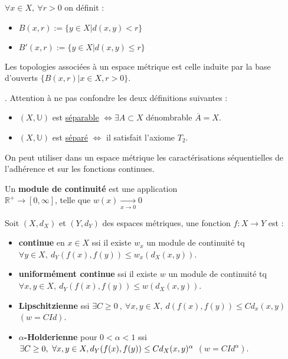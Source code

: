 \begin{definition}
    $\forall x\in X,\ \forall r>0$ on définit :
    \begin{itemize}
        \item $B(x,r):=\{y\in X|d(x,y)<r\} $
        \item $B'(x,r):=\{y\in X|d(x,y)\le r\} $
    \end{itemize}
\end{definition}

Les topologies associées à un espace métrique est celle induite par la base d'ouverts $\{B(x,r)|x\in X,r>0\} $.

\begin{remarque}.
Attention à ne pas confondre les deux définitions suivantes : 
    \begin{itemize}
        \item $(X,\mathbb{U})$ est \underline{séparable} $\Leftrightarrow \exists A\subset X $ dénombrable $\overline{A}=X$.
        \item $(X,\mathbb{U})$ est \underline{séparé} $\Leftrightarrow $ il satisfait l'axiome $T_2$.
\end{itemize}
\end{remarque}

On peut utiliser dans un espace métrique les caractérisations séquentielles de l'adhérence et sur les fonctions continues.

\begin{definition}
    Un \textbf{module de continuité} est une application\\$\mathbb{R} ^+\to [0,\infty ]$, telle que $w(x)\underset{x\to 0}{\longrightarrow} 0$
\end{definition}

\begin{definition}
    
Soit $(X,d_X)$ et $(Y,d_Y)$ des espaces métriques, une fonction $f:X\to Y$ est :
\begin{itemize}
    \item \textbf{continue} en $x\in X$ ssi il existe $w_x$ un module de continuité tq \\$ \forall y\in X,\ d_Y(f(x),f(y))\le w_x(d_X(x,y))$.
\item \textbf{uniformément continue} ssi il existe $w$ un module de continuité tq $\forall x,y\in X,\ d_Y(f(x),f(y))\le w(d_X(x,y))$.
\item \textbf{Lipschitzienne} ssi $\exists C \geq 0\ ,\ \forall x,y\in X,\ d(f(x),f(y))\le Cd_x(x,y)$ $(w=CId)$.
\item \textbf{$ \alpha$-Holderienne} pour $ 0<\alpha<1$  ssi $\exists C \geq 0,\ \forall x,y\in X,\\ d_Y(f(x),f(y))\le Cd_X(x,y)^\alpha$ $(w=CId^\alpha)$.
\end{itemize}

\end{definition}


